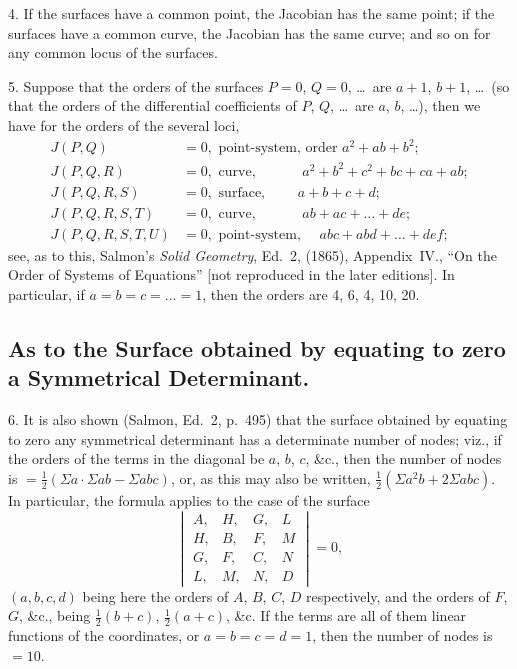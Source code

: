 \documentclass[11pt,a4paper]{article}
\begin{document}
4. If the surfaces have a common point, the Jacobian has the same point; if the surfaces have a common curve, the Jacobian has the same curve; and so on for any common locus of the surfaces.

5. Suppose that the orders of the surfaces $P = 0$, $Q = 0$, \ldots\ are $a+1$, $b+1$, \ldots\ (so that the orders of the differential coefficients of $P$, $Q$, \ldots\ are $a$, $b$, \ldots), then we have for the orders of the several loci,
\begin{align*}
J(P, Q) &= 0, \text{ point-system, order } a^2 + ab + b^2; \\
J(P, Q, R) &= 0, \text{ curve, }\qquad\quad a^2 + b^2 + c^2 + bc + ca + ab; \\
J(P, Q, R, S) &= 0, \text{ surface, }\qquad a + b + c + d; \\
J(P, Q, R, S, T) &= 0, \text{ curve, }\qquad\quad ab + ac + \ldots + de; \\
J(P, Q, R, S, T, U) &= 0, \text{ point-system, }\quad abc + abd + \ldots + def;
\end{align*}
see, as to this, Salmon's \textit{Solid Geometry}, Ed.~2, (1865), Appendix~IV., ``On the Order of Systems of Equations'' [not reproduced in the later editions]. In particular, if $a = b = c = \ldots = 1$, then the orders are 4, 6, 4, 10, 20.

\subsection*{As to the Surface obtained by equating to zero a Symmetrical Determinant.}

6. It is also shown (Salmon, Ed.~2, p.~495) that the surface obtained by equating to zero any symmetrical determinant has a determinate number of nodes; viz., if the orders of the terms in the diagonal be $a$, $b$, $c$, \&c., then the number of nodes is $= \tfrac{1}{2}(\Sigma a \cdot \Sigma ab - \Sigma abc)$, or, as this may also be written, $\tfrac{1}{2}(\Sigma a^2b + 2\Sigma abc)$. In particular, the formula applies to the case of the surface
\[
\begin{vmatrix}
A, & H, & G, & L \\
H, & B, & F, & M \\
G, & F, & C, & N \\
L, & M, & N, & D
\end{vmatrix} = 0,
\]
$(a, b, c, d)$ being here the orders of $A$, $B$, $C$, $D$ respectively, and the orders of $F$, $G$, \&c., being $\tfrac{1}{2}(b+c)$, $\tfrac{1}{2}(a+c)$, \&c. If the terms are all of them linear functions of the coordinates, or $a = b = c = d = 1$, then the number of nodes is $= 10$.
\end{document}
